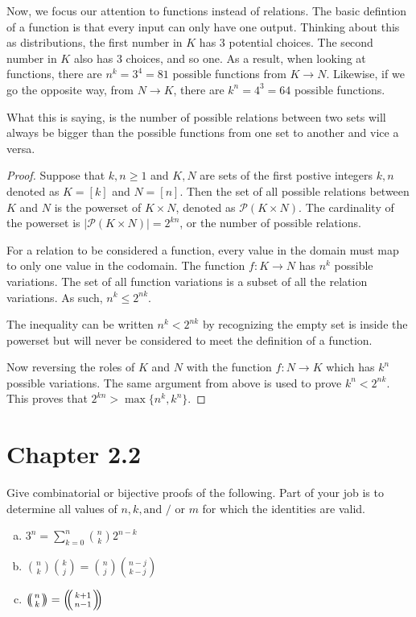 \documentclass{article}
\begin{document}
\medskip
Now, we focus our attention to functions instead of relations. The basic defintion of a function is that every input can only have one output. Thinking about this as distributions, the first number in $K$ has 3 potential choices. The second number in $K$ also has 3 choices, and so one. As a result, when looking at functions, there are $n^k = 3^4 = 81$ possible functions from $K \rightarrow N$. Likewise, if we go the opposite way, from $N \rightarrow K$, there are $k^n = 4^3 = 64$ possible functions.

\medskip
What this is saying, is the number of possible relations between two sets will always be bigger than the possible functions from one set to another and vice a versa.

\begin{proof}
Suppose that $k, n \ge 1$ and $K,N$ are sets of the first postive integers $k,n$ denoted as $K = [k]$ and $N = [n]$. Then the set of all possible relations between $K$ and $N$ is the powerset of $K \times N$, denoted as $\mathscr{P}(K \times N)$. The cardinality of the powerset is $|\mathscr{P}(K \times N)| = 2^{kn}$, or the number of possible relations.

\medskip
For a relation to be considered a function, every value in the domain must map to only one value in the codomain. The function $f: K \rightarrow N$ has $n^k$ possible variations. The set of all function variations is a subset of all the relation variations. As such, $n^k \le 2^{nk}$. 

\medskip
The inequality can be written $n^k < 2^{nk}$ by recognizing the empty set is inside the powerset but will never be considered to meet the definition of a function.

\medskip
Now reversing the roles of $K$ and $N$ with the function $f: N \rightarrow K$ which has $k^n$ possible variations. The same argument from above is used to prove $k^n < 2^{nk}$. This proves that $2^{kn} > \max \{n^k, k^n\}$.
\end{proof}

\section{Chapter 2.2}
\setcounter{problem}{3}
\begin{problem} %
Give combinatorial or bijective proofs of the following. Part of your job is to determine all values of $n, k, \text{and / or } m$ for which the identities are valid.
\begin{enumerate}[(a)]
    \item $3^n = \sum_{k=0}^{n} \binom{n}{k} 2^{n-k}$
    \item $\binom{n}{k} \binom{k}{j} = \binom{n}{j} \binom{n-j}{k-j}$
    \item $\multiset{n}{k} = \multiset{k+1}{n-1}$
\end{enumerate}
\end{problem}
\end{document}

